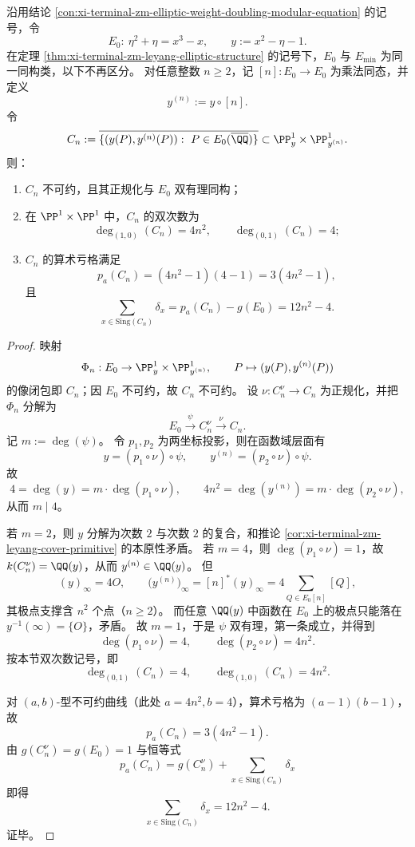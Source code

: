 \begin{theorem}\label{thm:xi-terminal-zm-elliptic-weight-n-correspondence-bidegree-delta}
沿用结论 \ref{con:xi-terminal-zm-elliptic-weight-doubling-modular-equation} 的记号，令
\[
E_0:\ \eta^2+\eta=x^3-x,\qquad
y:=x^2-\eta-1.
\]
在定理 \ref{thm:xi-terminal-zm-leyang-elliptic-structure} 的记号下，\(E_0\) 与 \(E_{\min}\) 为同一同构类，以下不再区分。
对任意整数 \(n\ge 2\)，记 \([n]:E_0\to E_0\) 为乘法同态，并定义
\[
y^{(n)}:=y\circ [n].
\]
令
\[
C_n:=\overline{\{(y(P),y^{(n)}(P)):\ P\in E_0(\overline{\QQ})\}}\subset \PP^1_y\times\PP^1_{y^{(n)}}.
\]
则：
\begin{enumerate}
  \item \(C_n\) 不可约，且其正规化与 \(E_0\) 双有理同构；
  \item 在 \(\PP^1\times\PP^1\) 中，\(C_n\) 的双次数为
  \[
  \deg_{(1,0)}(C_n)=4n^2,\qquad \deg_{(0,1)}(C_n)=4;
  \]
  \item \(C_n\) 的算术亏格满足
  \[
  p_a(C_n)=(4n^2-1)(4-1)=3(4n^2-1),
  \]
  且
  \[
  \sum_{x\in \mathrm{Sing}(C_n)}\delta_x
  =p_a(C_n)-g(E_0)
  =12n^2-4.
  \]
\end{enumerate}
\end{theorem}
\begin{proof}
映射
\[
\Phi_n:E_0\to \PP^1_y\times\PP^1_{y^{(n)}},\qquad P\mapsto (y(P),y^{(n)}(P))
\]
的像闭包即 \(C_n\)；因 \(E_0\) 不可约，故 \(C_n\) 不可约。
设 \(\nu:C_n^\nu\to C_n\) 为正规化，并把 \(\Phi_n\) 分解为
\[
E_0\xrightarrow{\psi} C_n^\nu \xrightarrow{\nu} C_n.
\]
记 \(m:=\deg(\psi)\)。
令 \(p_1,p_2\) 为两坐标投影，则在函数域层面有
\[
y=(p_1\circ\nu)\circ\psi,\qquad y^{(n)}=(p_2\circ\nu)\circ\psi.
\]
故
\[
4=\deg(y)=m\cdot \deg(p_1\circ\nu),\qquad
4n^2=\deg(y^{(n)})=m\cdot \deg(p_2\circ\nu),
\]
从而 \(m\mid 4\)。

若 \(m=2\)，则 \(y\) 分解为次数 \(2\) 与次数 \(2\) 的复合，和推论 \ref{cor:xi-terminal-zm-leyang-cover-primitive} 的本原性矛盾。
若 \(m=4\)，则 \(\deg(p_1\circ\nu)=1\)，故 \(k(C_n^\nu)=\QQ(y)\)，从而 \(y^{(n)}\in\QQ(y)\)。
但
\[
(y)_\infty=4O,\qquad
\bigl(y^{(n)}\bigr)_\infty=[n]^*(y)_\infty
=4\sum_{Q\in E_0[n]}[Q],
\]
其极点支撑含 \(n^2\) 个点（\(n\ge2\)）。
而任意 \(\QQ(y)\) 中函数在 \(E_0\) 上的极点只能落在 \(y^{-1}(\infty)=\{O\}\)，矛盾。
故 \(m=1\)，于是 \(\psi\) 双有理，第一条成立，并得到
\[
\deg(p_1\circ\nu)=4,\qquad
\deg(p_2\circ\nu)=4n^2.
\]
按本节双次数记号，即
\[
\deg_{(0,1)}(C_n)=4,\qquad
\deg_{(1,0)}(C_n)=4n^2.
\]

对 \((a,b)\)-型不可约曲线（此处 \(a=4n^2,b=4\)），算术亏格为 \((a-1)(b-1)\)，故
\[
p_a(C_n)=3(4n^2-1).
\]
由 \(g(C_n^\nu)=g(E_0)=1\) 与恒等式
\[
p_a(C_n)=g(C_n^\nu)+\sum_{x\in\mathrm{Sing}(C_n)}\delta_x
\]
即得
\[
\sum_{x\in\mathrm{Sing}(C_n)}\delta_x=12n^2-4.
\]
证毕。
\end{proof}

